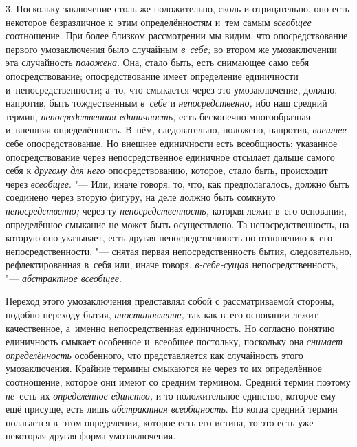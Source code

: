 3. Поскольку заключение столь же положительно, сколь и
отрицательно, оно есть некоторое безразличное к~этим определённостям и~тем
самым {\em всеобщее} соотношение. При более близком рассмотрении мы видим, что
опосредствование первого умозаключения было случайным {\em в~себе;} во втором
же умозаключении эта случайность {\em положена}. Она,
стало быть, есть снимающее само себя опосредствование; опосредствование
имеет определение единичности и~непосредственности; а~то, что смыкается
через это умозаключение, должно, напротив, быть тождественным
{\em в~себе} и {\em непосредственно,} ибо наш средний термин,
{\em непосредственная единичность,}
есть бесконечно многообразная и~внешняя определённость.
В~нём, следовательно, положено, напротив, {\em внешнее} себе
опосредствование. Но внешнее единичности есть всеобщность; указанное
опосредствование через непосредственное единичное отсылает дальше самого
себя к {\em другому для него}
опосредствованию, которое, стало быть, происходит через
{\em всеобщее}. "--- Или,
иначе говоря, то, что, как предполагалось, должно быть соединено через
вторую фигуру, на деле должно быть сомкнуто {\em непосредственно;}
через ту {\em непосредственность,}
которая лежит в~его основании, определённое смыкание не может
быть осуществлено. Та непосредственность, на которую оно указывает, есть
другая непосредственность по отношению к~его непосредственности, "---
снятая первая непосредственность бытия, следовательно,
рефлектированная в~себя или, иначе говоря,
{\em в-себе-сущая}
непосредственность, "---
{\em абстрактное всеобщее}.

Переход этого умозаключения представлял собой с
рассматриваемой стороны, подобно переходу бытия, {\em иностановление,}
так как в~его основании лежит качественное, а~именно
непосредственная единичность. Но согласно понятию единичность смыкает
особенное и~всеобщее постольку, поскольку она
{\em снимает определённость}
особенного, что представляется как случайность этого
умозаключения. Крайние термины смыкаются не через то их определённое
соотношение, которое они имеют со средним термином. Средний термин поэтому
{\em не}~есть их
{\em определённое единство,}
и то положительное единство, которое ему ещё присуще, есть
лишь {\em абстрактная всеобщность}.
Но когда средний термин полагается в~этом определении,
которое есть его истина, то это есть уже некоторая другая форма
умозаключения.

